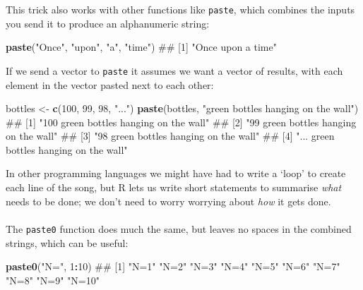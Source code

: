 \documentclass[]{article}
\newenvironment{Shaded}{\begin{snugshade}}{\end{snugshade}}
\newcommand{\KeywordTok}[1]{\textcolor[rgb]{0.13,0.29,0.53}{\textbf{#1}}}
\newcommand{\DecValTok}[1]{\textcolor[rgb]{0.00,0.00,0.81}{#1}}
\newcommand{\StringTok}[1]{\textcolor[rgb]{0.31,0.60,0.02}{#1}}
\newcommand{\OperatorTok}[1]{\textcolor[rgb]{0.81,0.36,0.00}{\textbf{#1}}}
\newcommand{\NormalTok}[1]{#1}
\let\oldparagraph\paragraph
\renewcommand{\paragraph}[1]{\oldparagraph{#1}\mbox{}}
\theoremstyle{definition}
\theoremstyle{definition}
\theoremstyle{definition}
\theoremstyle{remark}
\begin{document}
This trick also works with other functions like \texttt{paste}, which
combines the inputs you send it to produce an alphanumeric string:

\begin{Shaded}
\begin{Highlighting}[]
\KeywordTok{paste}\NormalTok{(}\StringTok{"Once"}\NormalTok{, }\StringTok{"upon"}\NormalTok{, }\StringTok{"a"}\NormalTok{, }\StringTok{"time"}\NormalTok{)}
\NormalTok{## [1] "Once upon a time"}
\end{Highlighting}
\end{Shaded}

If we send a vector to \texttt{paste} it assumes we want a vector of
results, with each element in the vector pasted next to each other:

\begin{Shaded}
\begin{Highlighting}[]
\NormalTok{bottles <-}\StringTok{ }\KeywordTok{c}\NormalTok{(}\DecValTok{100}\NormalTok{, }\DecValTok{99}\NormalTok{, }\DecValTok{98}\NormalTok{, }\StringTok{"..."}\NormalTok{)}
\KeywordTok{paste}\NormalTok{(bottles, }\StringTok{"green bottles hanging on the wall"}\NormalTok{)}
\NormalTok{## [1] "100 green bottles hanging on the wall"}
\NormalTok{## [2] "99 green bottles hanging on the wall" }
\NormalTok{## [3] "98 green bottles hanging on the wall" }
\NormalTok{## [4] "... green bottles hanging on the wall"}
\end{Highlighting}
\end{Shaded}

In other programming languages we might have had to write a `loop' to
create each line of the song, but R lets us write short statements to
summarise \emph{what} needs to be done; we don't need to worry worrying
about \emph{how} it gets done.

\paragraph{}\label{paste0}

The \texttt{paste0} function does much the same, but leaves no spaces in
the combined strings, which can be useful:

\begin{Shaded}
\begin{Highlighting}[]
\KeywordTok{paste0}\NormalTok{(}\StringTok{"N="}\NormalTok{, }\DecValTok{1}\OperatorTok{:}\DecValTok{10}\NormalTok{)}
\NormalTok{##  [1] "N=1"  "N=2"  "N=3"  "N=4"  "N=5"  "N=6"  "N=7"  "N=8"  "N=9"  "N=10"}
\end{Highlighting}
\end{Shaded}
\end{document}
